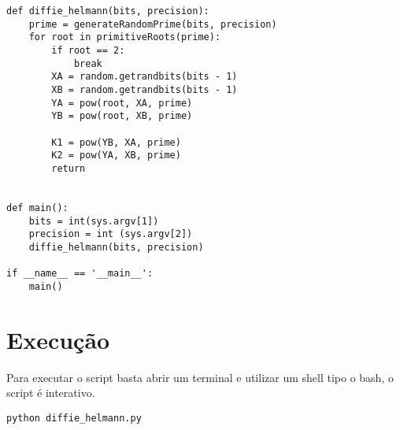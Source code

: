 \documentclass[a4paper,11pt]{article}
\theoremstyle{mytheor}
\begin{document}
\begin{lstlisting}[caption=Diffie Helmann utilizando Miller Rabin em Python.]
def diffie_helmann(bits, precision):
    prime = generateRandomPrime(bits, precision)
    for root in primitiveRoots(prime):
        if root == 2:
            break
        XA = random.getrandbits(bits - 1)
        XB = random.getrandbits(bits - 1)
        YA = pow(root, XA, prime)
        YB = pow(root, XB, prime)

        K1 = pow(YB, XA, prime)
        K2 = pow(YA, XB, prime)
        return


def main():
    bits = int(sys.argv[1])
    precision = int (sys.argv[2])
    diffie_helmann(bits, precision)

if __name__ == '__main__':
    main()

\end{lstlisting}

\section*{Execução}

Para executar o script basta abrir um terminal e utilizar um shell tipo o bash, o script é interativo.

\begin{lstlisting}[label={list:second},caption=Executando o script.]
python diffie_helmann.py
\end{lstlisting}
\end{document}

